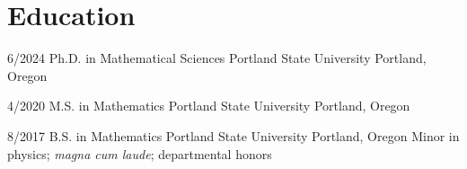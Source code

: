 \section{Education}

\cventry
{6/2024}
{Ph.D. in Mathematical Sciences}
{Portland State University}
{Portland, Oregon}
{}
{}

\cventry
{4/2020}
{M.S. in Mathematics}
{Portland State University}
{Portland, Oregon}
{}
{}

\cventry
{8/2017}
{B.S. in Mathematics}
{Portland State University}
{Portland, Oregon}
{}
{Minor in physics; \textit{magna cum laude}; departmental honors}
